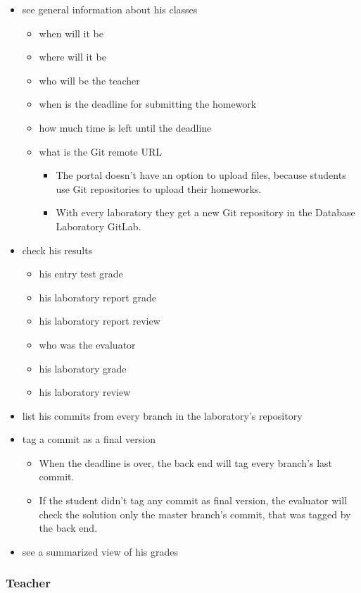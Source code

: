 \begin{itemize}
	\item see general information about his classes
	\begin{itemize}
		\item when will it be
		\item where will it be
		\item who will be the teacher
		\item when is the deadline for submitting the homework
		\item how much time is left until the deadline
		\item what is the Git remote URL
		\begin{itemize}
			\item The portal doesn't have an option to upload files, because students use Git repositories to upload their homeworks.
			\item With every laboratory they get a new Git repository in the Database Laboratory GitLab.
		\end{itemize}
	\end{itemize}
	\item check his results
	\begin{itemize}
		\item his entry test grade
		\item his laboratory report grade
		\item his laboratory report review
		\item who was the evaluator
		\item his laboratory grade
		\item his laboratory review
	\end{itemize}
	\item list his commits from every branch in the laboratory's repository
	\item tag a commit as a final version
	\begin{itemize}
		\item When the deadline is over, the back end will tag every branch's last commit.
		\item If the student didn't tag any commit as final version, the evaluator will check the solution only the master branch's commit, that was tagged by the back end.
	\end{itemize}
	\item see a summarized view of his grades
\end{itemize}

\subsubsection{Teacher}

